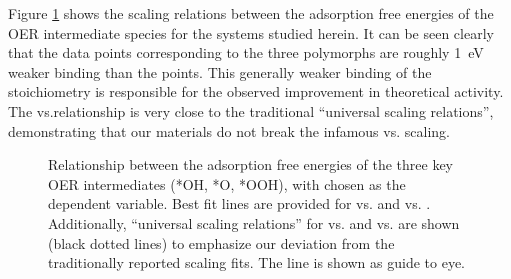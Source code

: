 %
Figure \ref{fig:scaling_relations} shows the scaling relations between the adsorption free energies of the OER intermediate species for the \IrOx systems studied herein.
%
It can be seen clearly that the data points corresponding to the three \IrOthree polymorphs are roughly \SI{1}{\electronvolt} weaker binding than the \rIrOtwo points.
%
This generally weaker binding of the \IrOthree stoichiometry is responsible for the observed improvement in theoretical activity.
%
The \DGOOH vs.\DGOH relationship is very close to the traditional ``universal scaling relations'', demonstrating that our materials do not break the infamous \DGOOH vs. \DGOH scaling.


\begin{figure}[!htb]
\centering
{}
\caption{\label{fig:scaling_relations}
Relationship between the adsorption free energies of the three key OER intermediates (*OH, *O, *OOH), with \DGOH chosen as the dependent variable.
Best fit lines are provided for \DGOOH vs. \DGOH and \DGO vs. \DGOH.
%
Additionally, ``universal scaling relations'' for \DGOOH vs. \DGOH and \DGO vs. \DGOH are shown (black dotted lines) to emphasize our deviation from the traditionally reported scaling fits.
The \DGOH line is  shown as guide to eye.
}
\end{figure}

